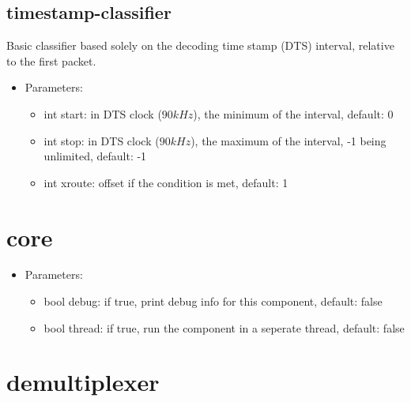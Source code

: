 \subsection{timestamp-classifier}
Basic classifier based solely on the decoding time stamp (DTS) interval, relative to the first packet.
\begin{itemize}
\item Parameters:
\begin{itemize}
\item int start: in DTS clock ($90kHz$), the minimum of the interval, default: 0
\item int stop: in DTS clock ($90kHz$), the maximum of the interval, -1 being unlimited, default: -1
\item int xroute: offset if the condition is met, default: 1
\end{itemize}
\end{itemize}
\newpage
\section{core}

\begin{itemize}
\item Parameters:
\begin{itemize}
\item bool debug: if true, print debug info for this component, default: false
\item bool thread: if true, run the component in a seperate thread, default: false
\end{itemize}
\end{itemize}
\newpage
\section{demultiplexer}


